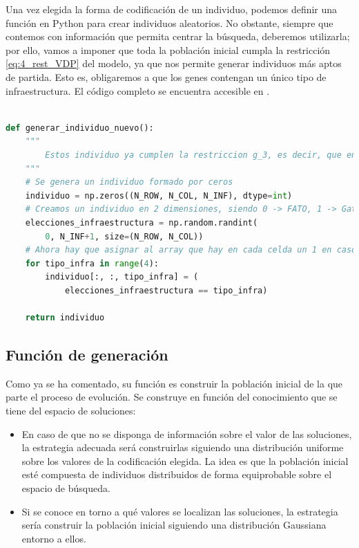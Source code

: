 \documentclass[12pt,a4paper]{book}
\begin{document}
Una vez elegida la forma de codificación de un individuo, podemos definir una función en Python para crear individuos aleatorios. No obstante, siempre que contemos con información que permita centrar la búsqueda, deberemos utilizarla; por ello, vamos a imponer que toda la población inicial cumpla la restricción \ref{eq:4_rest_VDP} del modelo, ya que nos permite generar individuos más aptos de partida. Esto es, obligaremos a que los genes contengan un único tipo de infraestructura. El código completo se encuentra accesible en \cite{gismeros_repositorio_2024}.   

\begin{lstlisting}[language=Python, caption={Función para generar un individuo.}, label={lst:generar_individuo_nuevo}]

def generar_individuo_nuevo():
    """
		Estos individuo ya cumplen la restriccion g_3, es decir, que en una celda hay, a lo sumo, un tipo de infraestructura.
    """
    # Se genera un individuo formado por ceros
    individuo = np.zeros((N_ROW, N_COL, N_INF), dtype=int)
    # Creamos un individuo en 2 dimensiones, siendo 0 -> FATO, 1 -> Gate, 2 -> Taxi, 3 -> Terminal y 4 -> Celda vacia
    elecciones_infraestructura = np.random.randint(
        0, N_INF+1, size=(N_ROW, N_COL))
    # Ahora hay que asignar al array que hay en cada celda un 1 en caso de que tenga una infraestructura de ese tipo
    for tipo_infra in range(4):
        individuo[:, :, tipo_infra] = (
            elecciones_infraestructura == tipo_infra)

    return individuo
\end{lstlisting}

\subsection{Función de generación}
Como ya se ha comentado, su función es construir la población inicial de la que parte el proceso de evolución. Se construye en función del conocimiento que se tiene del espacio de soluciones: 
\begin{itemize}
	\item En caso de que no se disponga de información sobre el valor de las soluciones, la estrategia adecuada será construirlas siguiendo una distribución uniforme sobre los valores de la codificación elegida. La idea es que la población inicial esté compuesta de individuos distribuidos de forma equiprobable sobre el espacio de búsqueda. 
	\item Si se conoce en torno a qué valores se localizan las soluciones, la estrategia sería construir la población inicial siguiendo una distribución Gaussiana entorno a ellos.  
\end{itemize}    
\end{document}
